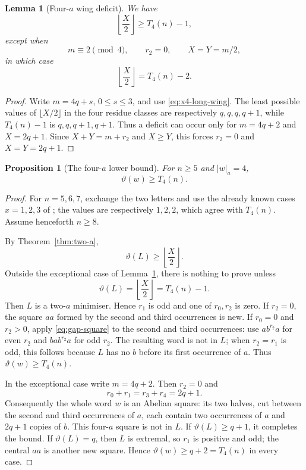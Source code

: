 \documentclass[11pt]{article}
\newtheorem{proposition}[theorem]{Proposition}
\newtheorem{lemma}[theorem]{Lemma}
\theoremstyle{definition}
\newcommand{\thetaas}{\vartheta}
\begin{document}
\begin{lemma}[Four-$a$ wing deficit]\label{lem:x4-deficit}
We have
\[
 \left\lfloor\frac X2\right\rfloor\ge T_4(n)-1,
\]
except when
\[
 m\equiv2\pmod4,\qquad r_2=0,\qquad X=Y=m/2,
\]
in which case
\[
 \left\lfloor\frac X2\right\rfloor=T_4(n)-2.
\]
\end{lemma}

\begin{proof}
Write $m=4q+s$, $0\le s\le3$, and use \eqref{eq:x4-long-wing}. The least possible values of $\lfloor X/2\rfloor$ in the four residue classes are respectively $q,q,q,q+1$, while $T_4(n)-1$ is $q,q,q+1,q+1$. Thus a deficit can occur only for $m=4q+2$ and $X=2q+1$. Since $X+Y=m+r_2$ and $X\ge Y$, this forces $r_2=0$ and $X=Y=2q+1$.
\end{proof}

\begin{proposition}[The four-$a$ lower bound]\label{prop:x4-lower}
For $n\ge5$ and $|w|_a=4$,
\[
 \thetaas(w)\ge T_4(n).
\]
\end{proposition}

\begin{proof}
For $n=5,6,7$, exchange the two letters and use the already known cases $x=1,2,3$ of \cite{FMMS2026}; the values are respectively $1,2,2$, which agree with $T_4(n)$. Assume henceforth $n\ge8$.

By Theorem~\ref{thm:two-a},
\[
 \thetaas(L)\ge\left\lfloor\frac X2\right\rfloor.
\]
Outside the exceptional case of Lemma~\ref{lem:x4-deficit}, there is nothing to prove unless
\[
 \thetaas(L)=\left\lfloor\frac X2\right\rfloor=T_4(n)-1.
\]
Then $L$ is a two-$a$ minimiser. Hence $r_1$ is odd and one of $r_0,r_2$ is zero. If $r_2=0$, the square $aa$ formed by the second and third occurrences is new. If $r_0=0$ and $r_2>0$, apply \eqref{eq:gap-square} to the second and third occurrences: use $ab^{r_2}a$ for even $r_2$ and $bab^{r_2}a$ for odd $r_2$. The resulting word is not in $L$; when $r_2=r_1$ is odd, this follows because $L$ has no $b$ before its first occurrence of $a$. Thus $\thetaas(w)\ge T_4(n)$.

In the exceptional case write $m=4q+2$. Then $r_2=0$ and
\[
 r_0+r_1=r_3+r_4=2q+1.
\]
Consequently the whole word $w$ is an Abelian square: its two halves, cut between the second and third occurrences of $a$, each contain two occurrences of $a$ and $2q+1$ copies of $b$. This four-$a$ square is not in $L$. If $\thetaas(L)\ge q+1$, it completes the bound. If $\thetaas(L)=q$, then $L$ is extremal, so $r_1$ is positive and odd; the central $aa$ is another new square. Hence $\thetaas(w)\ge q+2=T_4(n)$ in every case.
\end{proof}
\end{document}
